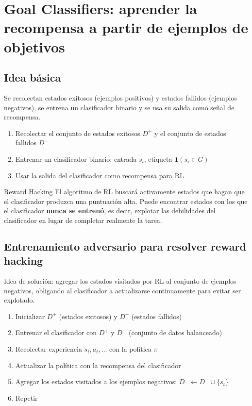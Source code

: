 \section{Goal Classifiers: aprender la recompensa a partir de ejemplos de objetivos}

\subsection{Idea básica}

Se recolectan estados exitosos (ejemplos positivos) y estados fallidos (ejemplos negativos), se entrena un clasificador binario y se usa su salida como señal de recompensa.

\begin{enumerate}
    \item Recolectar el conjunto de estados exitosos $D^+$ y el conjunto de estados fallidos $D^-$
    \item Entrenar un clasificador binario: entrada $s_i$, etiqueta $\mathbf{1}(s_i \in G)$
    \item Usar la salida del clasificador como recompensa para RL
\end{enumerate}

\begin{warningbox}{Reward Hacking}
El algoritmo de RL buscará activamente estados que hagan que el clasificador produzca una puntuación alta. Puede encontrar estados con los que el clasificador \textbf{nunca se entrenó}, es decir, explotar las debilidades del clasificador en lugar de completar realmente la tarea.
\end{warningbox}

\subsection{Entrenamiento adversario para resolver reward hacking}

Idea de solución: agregar los estados visitados por RL al conjunto de ejemplos negativos, obligando al clasificador a actualizarse continuamente para evitar ser explotado.

\begin{enumerate}
    \item Inicializar $D^+$ (estados exitosos) y $D^-$ (estados fallidos)
    \item Entrenar el clasificador con $D^+$ y $D^-$ (conjunto de datos balanceado)
    \item Recolectar experiencia $s_t, a_t, \ldots$ con la política $\pi$
    \item Actualizar la política con la recompensa del clasificador
    \item Agregar los estados visitados a los ejemplos negativos: $D^- \leftarrow D^- \cup \{s_t\}$
    \item Repetir
\end{enumerate}

